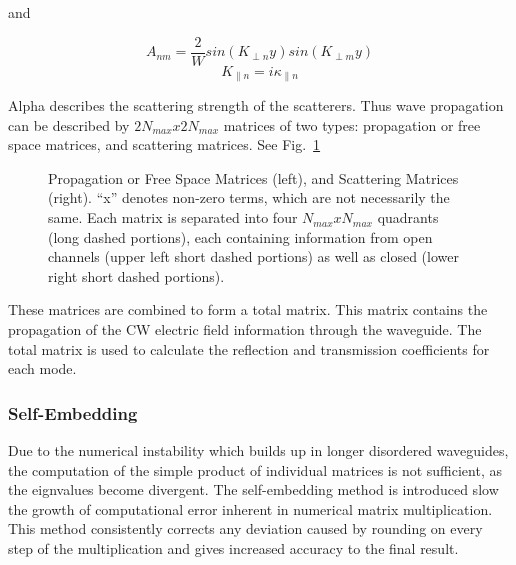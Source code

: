 and

\begin{equation}
A_{nm}=\frac{2}{W}sin(K_{\perp n}y)sin(K_{\perp m}y)
\end{equation}
\begin{equation}
K_{\parallel n}=i\kappa_{\parallel n}
\end{equation}

Alpha describes the scattering strength of the scatterers. Thus wave
propagation can be described by $2 N_{max} x 2 N_{max}$ matrices of two types:
propagation or free space matrices, and scattering matrices. 
See Fig.~\ref{fig:tomsmatrices}

\begin{figure}
\vskip -0.5cm
\centerline{
\quad \quad \quad \quad
}
\vskip -0.5cm
\caption{Propagation or Free Space Matrices (left),
and Scattering Matrices (right). ``x'' denotes non-zero terms, which are not necessarily the same. 
Each matrix is separated into four $N_{max} x N_{max}$ quadrants 
(long dashed portions), each containing information from open channels
(upper left short dashed portions) as well as closed (lower right short
dashed portions). }
\label{fig:tomsmatrices}
\end{figure}

These matrices are combined to form a total matrix.
This matrix contains the propagation of the CW electric field information through the 
waveguide. The total matrix is used to calculate the reflection and
transmission coefficients for each mode.

\subsubsection {Self-Embedding}

Due to the numerical instability which builds up in longer disordered
waveguides, the computation of the simple product of individual matrices is
not sufficient, as the eignvalues become divergent. The self-embedding method is introduced 
slow the growth of computational error inherent in numerical matrix multiplication.
This method consistently corrects any deviation caused by rounding on every step of the multiplication and 
gives increased accuracy to the final result.  %

